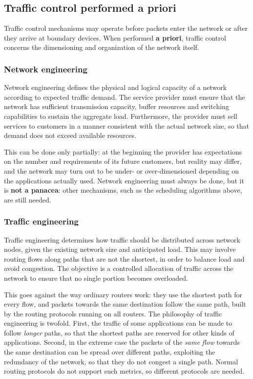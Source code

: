 \documentclass[11pt,a4paper,openany]{report}
\begin{document}
\subsection{Traffic control performed a priori}

Traffic control mechanisms may operate before packets enter the network or after they arrive at boundary devices. When performed \textbf{a priori}, traffic control concerns the dimensioning and organization of the network itself.

\subsubsection*{Network engineering}

Network engineering defines the physical and logical capacity of a network according to expected traffic demand. The service provider must ensure that the network has sufficient transmission capacity, buffer resources and switching capabilities to sustain the aggregate load. Furthermore, the provider must sell services to customers in a manner consistent with the actual network size, so that demand does not exceed available resources.

This can be done only partially: at the beginning the provider has expectations on the number and requirements of its future customers, but reality may differ, and the network may turn out to be under- or over-dimensioned depending on the applications actually used. Network engineering must always be done, but it is \textbf{not a panacea}: other mechanisms, such as the scheduling algorithms above, are still needed.

\subsubsection*{Traffic engineering}

Traffic engineering determines how traffic should be distributed across network nodes, given the existing network size and anticipated load. This may involve routing flows along paths that are not the shortest, in order to balance load and avoid congestion. The objective is a controlled allocation of traffic across the network to ensure that no single portion becomes overloaded.

This goes against the way ordinary routers work: they use the shortest path for every flow, and packets towards the same destination follow the same path, built by the routing protocols running on all routers. The philosophy of traffic engineering is twofold. First, the traffic of some applications can be made to follow \emph{longer} paths, so that the shortest paths are reserved for other kinds of applications. Second, in the extreme case the packets of the \emph{same flow} towards the same destination can be spread over different paths, exploiting the redundancy of the network, so that they do not congest a single path. Normal routing protocols do not support such metrics, so different protocols are needed.
\end{document}

